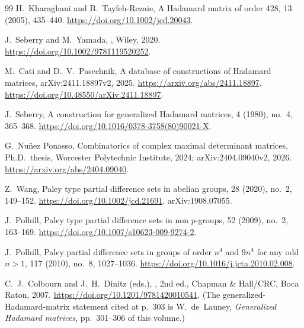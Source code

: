 \documentclass[11pt]{article}
\begin{document}
\begin{thebibliography}{99}
H.~Kharaghani and B.~Tayfeh-Rezaie,
\newblock A Hadamard matrix of order 428,
 13 (2005), 435--440.
\newblock \url{https://doi.org/10.1002/jcd.20043}.

J.~Seberry and M.~Yamada,
,
\newblock Wiley, 2020.
\newblock \url{https://doi.org/10.1002/9781119520252}.

M.~Cati and D.~V.~Pasechnik,
\newblock A database of constructions of Hadamard matrices,
\newblock arXiv:2411.18897v2, 2025.
\newblock \url{https://arxiv.org/abs/2411.18897}.
\newblock \url{https://doi.org/10.48550/arXiv.2411.18897}.

J.~Seberry,
\newblock A construction for generalized Hadamard matrices,
 4 (1980), no.\ 4, 365--368.
\newblock \url{https://doi.org/10.1016/0378-3758(80)90021-X}.

G.~Nu\~nez Ponasso,
\newblock Combinatorics of complex maximal determinant matrices,
\newblock Ph.D.\ thesis, Worcester Polytechnic Institute, 2024;
  arXiv:2404.09040v2, 2026.
\newblock \url{https://arxiv.org/abs/2404.09040}.

Z.~Wang,
\newblock Paley type partial difference sets in abelian groups,
 28 (2020), no.\ 2, 149--152.
\newblock \url{https://doi.org/10.1002/jcd.21691}.
\newblock arXiv:1908.07055.

J.~Polhill,
\newblock Paley type partial difference sets in non \(p\)-groups,
 52 (2009), no.\ 2, 163--169.
\newblock \url{https://doi.org/10.1007/s10623-009-9274-2}.

J.~Polhill,
\newblock Paley partial difference sets in groups of order \(n^{4}\) and
  \(9n^{4}\) for any odd \(n>1\),
 117 (2010), no.\ 8, 1027--1036.
\newblock \url{https://doi.org/10.1016/j.jcta.2010.02.008}.

C.~J.~Colbourn and J.~H.~Dinitz (eds.),
,
\newblock 2nd ed., Chapman \& Hall/CRC, Boca Raton, 2007.
\newblock \url{https://doi.org/10.1201/9781420010541}.
\newblock (The generalized-Hadamard-matrix statement cited at p.~303 is
  W.~de~Launey, \emph{Generalized Hadamard matrices}, pp.~301--306 of this
  volume.)


\end{thebibliography}
\end{document}
